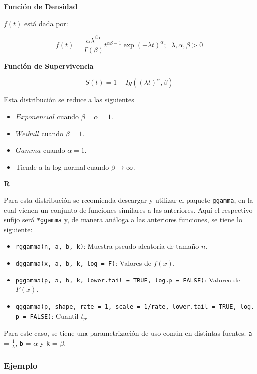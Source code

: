 \documentclass[
  a4paper,
  oneside,
  openany]{book}
\providecommand{\tightlist}{%
  \setlength{\itemsep}{0pt}\setlength{\parskip}{0pt}}
\begin{document}
\textbf{Función de Densidad}

\(f(t)\) está dada por:

\[
f(t)=\frac{\alpha\lambda^{\beta\alpha}}{\Gamma(\beta)}t^{\alpha\beta-1}\exp(-\lambda t)^\alpha; \ \ \  \lambda,\alpha, \beta>0
\]

\textbf{Función de Supervivencia}

\[
S(t)=1-Ig((\lambda t)^\alpha, \beta)
\]

Esta distribución se reduce a las siguientes

\begin{itemize}
\tightlist
\item
  \(Exponencial\) cuando \(\beta = \alpha = 1\).
\item
  \(Weibull\) cuando \(\beta = 1\).
\item
  \(Gamma\) cuando \(\alpha = 1\).
\item
  Tiende a la log-normal cuando \(\beta\rightarrow\infty\).
\end{itemize}

\textbf{R}

Para esta distribución se recomienda descargar y utilizar el paquete \texttt{ggamma}, en la cual vienen un conjunto de funciones similares a las anteriores. Aquí el respectivo sufijo será \texttt{*ggamma} y, de manera análoga a las anteriores funciones, se tiene lo siguiente:

\begin{itemize}
\tightlist
\item
  \texttt{rggamma(n,\ a,\ b,\ k)}: Muestra pseudo aleatoria de tamaño \(n\).
\item
  \texttt{dggamma(x,\ a,\ b,\ k,\ log\ =\ F)}: Valores de \(f(x)\).
\item
  \texttt{pggamma(p,\ a,\ b,\ k,\ lower.tail\ =\ TRUE,\ log.p\ =\ FALSE)}: Valores de \(F(x)\).
\item
  \texttt{qggamma(p,\ shape,\ rate\ =\ 1,\ scale\ =\ 1/rate,\ lower.tail\ =\ TRUE,\ log.p\ =\ FALSE)}: Cuantil \(t_p\).
\end{itemize}

Para este caso, se tiene una parametrización de uso común en distintas fuentes. \texttt{a} = \(\frac{1}{\lambda}\), \texttt{b} = \(\alpha\) y \texttt{k} = \(\beta\).

\hypertarget{ejemplo-7}{%
\subsubsection*{Ejemplo}\label{ejemplo-7}}
\end{document}
